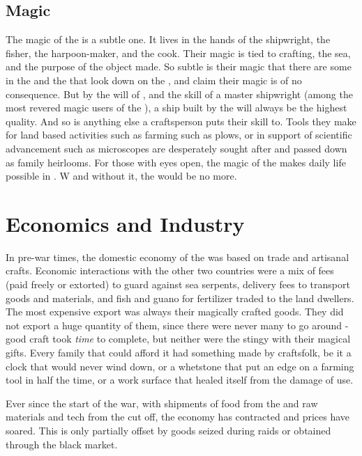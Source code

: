 \documentclass[blue]{GL2020}
\begin{document}
\subsection*{Magic}
The magic of the \pShip{} is a subtle one. It lives in the hands of the shipwright, the fisher, the harpoon-maker, and the cook. Their magic is tied to crafting, the sea, and the purpose of the object made. So subtle is their magic that there are some in the \pFarm{} and the \pTech{} that look down on the \pShippies{}, and claim their magic is of no consequence. But by the will of \cEbb{\full}, and the skill of a master shipwright (among the most revered magic users of the \pShippies{}), a ship built by the \pShippies{} will always be the highest quality. And so is anything else a \pShippie{} craftsperson puts their skill to. Tools they make for land based activities such as farming such as plows, or in support of scientific advancement such as microscopes are desperately sought after and passed down as family heirlooms. For those with eyes open, the magic of the \pShippies{} makes daily life possible in \pEarth{}. W and without it, the \pShippies{} would be no more.

\section*{Economics and Industry}
In pre-war times, the domestic economy of the \pShip{} was based on trade and artisanal crafts. Economic interactions with the other two countries were a mix of fees (paid freely or extorted) to guard against sea serpents, delivery fees to transport goods and materials, and fish and guano for fertilizer traded to the land dwellers. The \pShippies{} most expensive export was always their magically crafted goods. They did not export a huge quantity of them, since there were never many to go around - good craft took \emph{time} to complete, but neither were the \pShippies{} stingy with their magical gifts. Every family that could afford it had something made by \pShippie{} craftsfolk, be it a clock that would never wind down, or a whetstone that put an edge on a farming tool in half the time, or a work surface that healed itself from the damage of use.

Ever since the start of the war, with shipments of food from the \pFarm{}and raw materials and tech from the \pTech{}cut off, the \pShippie{}economy has contracted and prices have soared. This is only partially offset by goods seized during raids or obtained through the black market.
\end{document}
